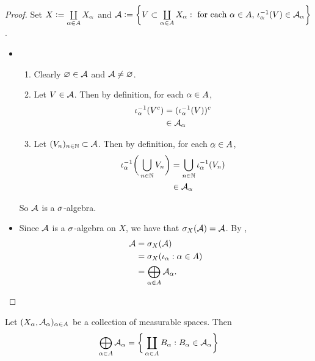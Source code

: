 \documentclass{book}
\begin{document}
	\begin{proof}
		Set $X \vcentcolon= \coprod\limits_{\alpha \in A}  X_{\alpha}$ and $\mathcal{A} \vcentcolon= \bigg \{V \subset \coprod\limits_{\alpha \in A} X_{\alpha}: \text{ for each $\alpha \in A$, $\iota_{\alpha}^{-1}(V) \in \mathcal{A}_{\alpha}$} \bigg \}$.
		\begin{itemize}
			\item \begin{enumerate}
				\item Clearly $\varnothing \in \mathcal{A}$ and $\mathcal{A} \neq \varnothing$.
				\item Let $V \in \mathcal{A}$. Then by definition, for each $\alpha \in A$,
				\begin{align*}
					\iota_{\alpha}^{-1}(V^c)
					& = ( \iota_{\alpha}^{-1}(V))^c \\
					& \in \mathcal{A}_{\alpha}
				\end{align*}
				\item Let $(V_n)_{n \in \mathbb{N}} \subset \mathcal{A}$. Then by definition, for each $\alpha \in A$,
				\begin{align*}
					\iota_{\alpha}^{-1}\bigg( \bigcup_{n \in \mathbb{N}} V_n \bigg)
					& = \bigcup_{n \in \mathbb{N}} \iota_{\alpha}^{-1}(V_n)\\
					& \in \mathcal{A}_{\alpha}
				\end{align*}
			\end{enumerate}
			So $\mathcal{A}$ is a $\sigma$-algebra.
			\item Since $\mathcal{A}$ is a $\sigma$-algebra on $X$, we have that $\sigma_X(\mathcal{A}) = \mathcal{A}$. By , 
			\begin{align*}
				\mathcal{A}
				& = \sigma_X(\mathcal{A}) \\
				& = \sigma_X(\iota_{\alpha}: \alpha \in A) \\
				& = \bigoplus\limits_{\alpha \in A} \mathcal{A}_{\alpha}.
			\end{align*}
		\end{itemize}
	\end{proof}

	\begin{ex} 
		Let $(X_{\alpha}, \mathcal{A}_{\alpha})_{\alpha \in A}$ be a collection of measurable spaces. Then 
		$$\bigoplus\limits_{\alpha \in A} \mathcal{A}_{\alpha} = \bigg \{\coprod_{\alpha \in A} B_{\alpha}: B_{\alpha} \in \mathcal{A}_{\alpha} \bigg\} $$
	\end{ex}
\end{document}
